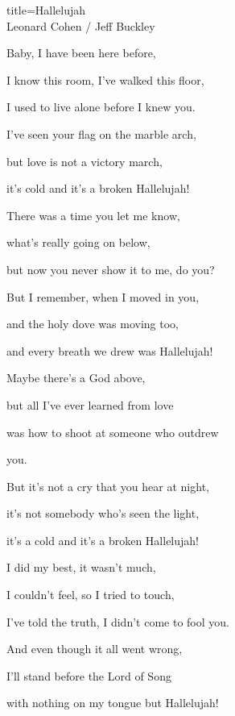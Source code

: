 \begin{song}{title=\centering Hallelujah \\\normalsize Leonard Cohen / Jeff Buckley \vspace*{-0.3cm}}
{\begin{minipage}[t]{0.48\textwidth}
\sloka
	Baby, I have been here before,  
	
	I know this room, I've walked this floor,  
	
	I used to live alone before I knew you.  
	
	I've seen your flag on the marble arch,  
	
	but love is not a victory march,  
	
	it's cold and it's a broken Hallelujah!  


\end{minipage}\begin{minipage}[t]{0.48\textwidth}\setlength{\parindent}{0.45cm}  %
\vspace*{0.5cm}

\sloka
	There was a time you let me know,   
	
	what's really going on below,   
	
	but now you never show it to me, do you?   
	
	But I remember, when I moved in you,   
	
	and the holy dove was moving too,   
	
	and every breath we drew was Hallelujah!   
	

\sloka
	Maybe there's a God above,   
	
	but all I've ever learned from love   
	
	was how to shoot at someone who outdrew 
	
		you.   
	
	But it's not a cry that you hear at night,   
	
	it's not somebody who's seen the light,   
	
	it's a cold and it's a broken Hallelujah!   
	
\sloka
	I did my best, it wasn't much,   
	
	I couldn't feel, so I tried to touch,   
	
	I've told the truth, I didn't come to fool you.   
	
	And even though it all went wrong,   
	
	I'll stand before the Lord of Song   
	
	with nothing on my tongue but Hallelujah!   
	


\end{minipage}   %
}
\setcounter{Slokočet}{0}
\end{song}

